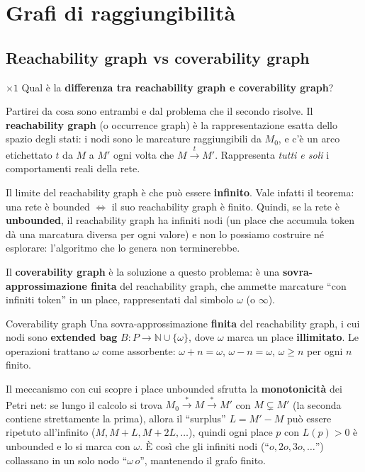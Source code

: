 \chapter{Grafi di raggiungibilità}

\section{Reachability graph vs coverability graph}

\begin{domanda}{$\times 1$}
Qual è la \textbf{differenza tra reachability graph e coverability graph}?
\end{domanda}

Partirei da cosa sono entrambi e dal problema che il secondo risolve. Il \textbf{reachability graph} (o occurrence graph) è la rappresentazione esatta dello spazio degli stati: i nodi sono le marcature raggiungibili da $M_0$, e c'è un arco etichettato $t$ da $M$ a $M'$ ogni volta che $M \xrightarrow{t} M'$. Rappresenta \emph{tutti e soli} i comportamenti reali della rete.

Il limite del reachability graph è che può essere \textbf{infinito}. Vale infatti il teorema: una rete è bounded $\iff$ il suo reachability graph è finito. Quindi, se la rete è \textbf{unbounded}, il reachability graph ha infiniti nodi (un place che accumula token dà una marcatura diversa per ogni valore) e non lo possiamo costruire né esplorare: l'algoritmo che lo genera non terminerebbe.

Il \textbf{coverability graph} è la soluzione a questo problema: è una \textbf{sovra-approssimazione finita} del reachability graph, che ammette marcature ``con infiniti token'' in un place, rappresentati dal simbolo $\omega$ (o $\infty$).

\begin{definizione}{Coverability graph}
Una sovra-approssimazione \textbf{finita} del reachability graph, i cui nodi sono \textbf{extended bag} $B : P \to \mathbb{N} \cup \{\omega\}$, dove $\omega$ marca un place \textbf{illimitato}. Le operazioni trattano $\omega$ come assorbente: $\omega + n = \omega$, $\omega - n = \omega$, $\omega \ge n$ per ogni $n$ finito.
\end{definizione}

Il meccanismo con cui scopre i place unbounded sfrutta la \textbf{monotonicità} dei Petri net: se lungo il calcolo si trova $M_0 \xrightarrow{\ast} M \xrightarrow{\ast} M'$ con $M \subsetneq M'$ (la seconda contiene strettamente la prima), allora il ``surplus'' $L = M' - M$ può essere ripetuto all'infinito ($M, M+L, M+2L, \dots$), quindi ogni place $p$ con $L(p) > 0$ è unbounded e lo si marca con $\omega$. È così che gli infiniti nodi (``$o, 2o, 3o, \dots$'') collassano in un solo nodo ``$\omega\, o$'', mantenendo il grafo finito.

